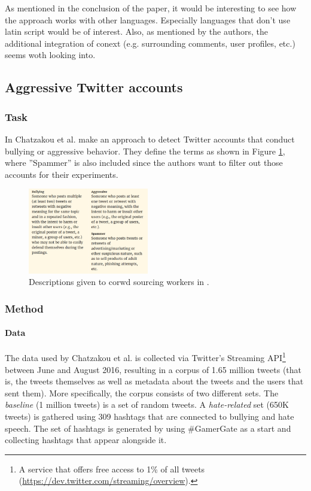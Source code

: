 \documentclass{proseminar}
\begin{document}
As mentioned in the conclusion of the paper, it would be interesting to see how the approach works with other languages. Especially languages that don't use latin script would be of interest. Also, as mentioned by the authors, the additional integration of conext (e.g. surrounding comments, user profiles, etc.) seems woth looking into.

\subsection{Aggressive Twitter accounts}
\subsubsection{Task}
In \cite{Twitter:2017} Chatzakou et al. make an approach to detect Twitter accounts that conduct bullying or aggressive behavior. They define the terms as shown in Figure \ref{fig:twitter_defs}, where ''Spammer'' is also included since the authors want to filter out those accounts for their experiments.

\begin{figure}
\centering
\includegraphics[width=0.47\textwidth]{img/twitter_defs}
\caption{Descriptions given to corwd sourcing workers in \cite{Twitter:2017}.}
\label{fig:twitter_defs}
\end{figure}

\subsubsection{Method}
\paragraph{Data} The data used by Chatzakou et al. is collected via Twitter's Streaming API\footnote{A service that offers free access to 1\% of all tweets (\url{https://dev.twitter.com/streaming/overview}).} between June and August 2016, resulting in a corpus of 1.65 million tweets (that is, the tweets themselves as well as metadata about the tweets and the users that sent them). More specifically, the corpus consists of two different sets. The \emph{baseline} (1 million tweets) is a set of random tweets. A \emph{hate-related} set (650K tweets) is gathered using 309 hashtags that are connected to bullying and hate speech. The set of hashtags is generated by using \#GamerGate as a start and collecting hashtags that appear alongside it.
\end{document}
